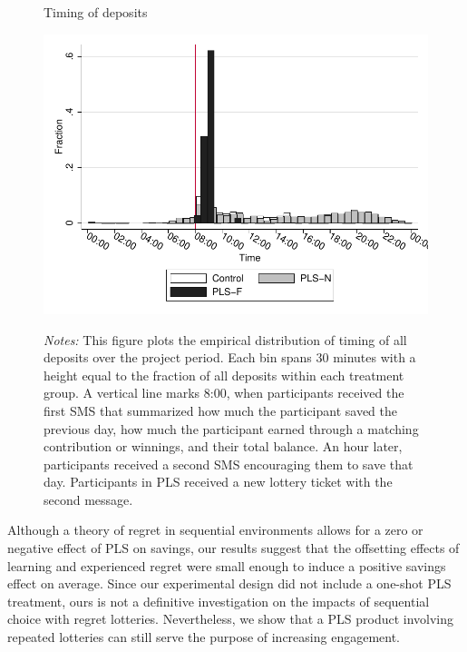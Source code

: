 \documentclass[12pt]{article}
\begin{document}
		\begin{figure}[ht]
		\centering
		\caption{Timing of deposits}
		\includegraphics[width=\textwidth]{../../figures/hist-deposits.pdf}
		\label{fig:hist-deposits}
		\caption*{\footnotesize \emph{Notes:} This figure plots the empirical distribution of timing of all deposits over the project period. Each bin spans 30 minutes with a height equal to the fraction of all deposits within each treatment group. A vertical line marks 8:00, when participants received the first SMS that summarized how much the participant saved the previous day, how much the participant earned through a matching contribution or winnings, and their total balance. An hour later, participants received a second SMS encouraging them to save that day. Participants in PLS received a new lottery ticket with the second message.}
		\end{figure}

		Although a theory of regret in sequential environments allows for a zero or negative effect of PLS on savings, our results suggest that the offsetting effects of learning and experienced regret were small enough to induce a positive savings effect on average. Since our experimental design did not include a one-shot PLS treatment, ours is not a definitive investigation on the impacts of sequential choice with regret lotteries. Nevertheless, we show that a PLS product involving repeated lotteries can still serve the purpose of increasing engagement.

\end{document}
